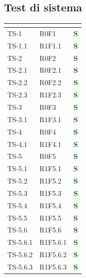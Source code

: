 \subsection{Test di sistema}
\begin{longtable}{|C{2.5cm}|C{2.5cm}|C{2.5cm}|}
	\hline
	\textbf{\color{title_text}{Test}} & \textbf{\color{title_text}{Requisito}} & \textbf{\color{title_text}{Stato}} \\
	\hline
	\endhead
	{TS-1} & {R0F1} & \textcolor{darkgreen}{\textbf{S}}\\
	\hline
	{TS-1.1} & {R1F1.1} & \textcolor{darkgreen}{\textbf{S}}\\
	\hline
	{TS-2} & {R0F2}  & \textcolor{darkgreen}{\textbf{S}}\\
	\hline
	{TS-2.1} & {R0F2.1}  & \textcolor{darkgreen}{\textbf{S}} \\
	\hline
	{TS-2.2} & {R0F2.2} & \textcolor{darkgreen}{\textbf{S}} \\
	\hline
	{TS-2.3} & {R1F2.3} & \textcolor{darkgreen}{\textbf{S}} \\
	\hline
	{TS-3} & {R0F3} & \textcolor{darkgreen}{\textbf{S}}\\
	\hline
	{TS-3.1} & {R1F3.1} & \textcolor{darkgreen}{\textbf{S}}\\
	\hline
	{TS-4} & {R0F4} & \textcolor{darkgreen}{\textbf{S}}\\
	\hline
	{TS-4.1} & {R1F4.1} & \textcolor{darkgreen}{\textbf{S}}\\
	\hline
	{TS-5} & {R0F5} & \textcolor{darkgreen}{\textbf{S}}\\
	\hline
	{TS-5.1} & {R1F5.1} & \textcolor{darkgreen}{\textbf{S}}\\
	\hline
	{TS-5.2} & {R1F5.2}  & \textcolor{darkgreen}{\textbf{S}}\\
	\hline
	{TS-5.3} & {R1F5.3} & \textcolor{darkgreen}{\textbf{S}}\\
	\hline
	{TS-5.4} & {R1F5.4} & \textcolor{darkgreen}{\textbf{S}}\\
	\hline
	{TS-5.5} & {R1F5.5} & \textcolor{darkgreen}{\textbf{S}}\\
	\hline
	{TS-5.6} & {R1F5.6} & \textcolor{darkgreen}{\textbf{S}}\\
	\hline
	{TS-5.6.1} & {R1F5.6.1} & \textcolor{darkgreen}{\textbf{S}}\\
	\hline
	{TS-5.6.2} & {R1F5.6.2} & \textcolor{darkgreen}{\textbf{S}}\\
	\hline
	{TS-5.6.3} & {R1F5.6.3} & \textcolor{darkgreen}{\textbf{S}}\\

\end{longtable}
